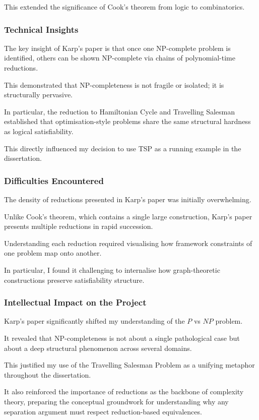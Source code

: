 \documentclass[12pt]{article}
\begin{document}
This extended the significance of Cook's theorem from logic to combinatorics.

\subsubsection*{Technical Insights}

The key insight of Karp's paper is that once one NP-complete problem is identified, others can be shown NP-complete via chains of polynomial-time reductions.

This demonstrated that NP-completeness is not fragile or isolated; it is structurally pervasive.

In particular, the reduction to Hamiltonian Cycle and Travelling Salesman established that optimisation-style problems share the same structural hardness as logical satisfiability.

This directly influenced my decision to use TSP as a running example in the dissertation.

\subsubsection*{Difficulties Encountered}

The density of reductions presented in Karp's paper was initially overwhelming.

Unlike Cook's theorem, which contains a single large construction, Karp's paper presents multiple reductions in rapid succession.

Understanding each reduction required visualising how framework constraints of one problem map onto another.

In particular, I found it challenging to internalise how graph-theoretic constructions preserve satisfiability structure.

\subsubsection*{Intellectual Impact on the Project}

Karp's paper significantly shifted my understanding of the $P$ vs $NP$ problem.

It revealed that NP-completeness is not about a single pathological case but about a deep structural phenomenon across several domains.

This justified my use of the Travelling Salesman Problem as a unifying metaphor throughout the dissertation.

It also reinforced the importance of reductions as the backbone of complexity theory, preparing the conceptual groundwork for understanding why any separation argument must respect reduction-based equivalences.
\end{document}
